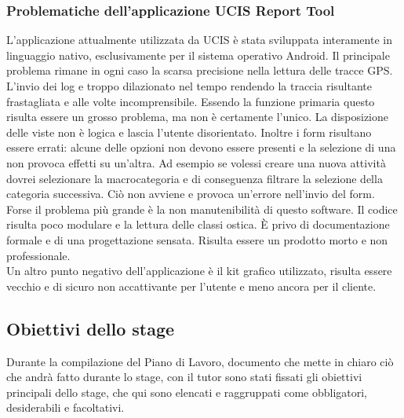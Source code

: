 \subsubsection{Problematiche dell'applicazione UCIS Report Tool}
L'applicazione attualmente utilizzata da UCIS è stata sviluppata interamente in linguaggio nativo, esclusivamente per il
sistema operativo \gls{Android}. Il principale problema rimane in ogni caso la scarsa precisione nella lettura delle
tracce GPS. L'invio dei log e troppo dilazionato nel tempo rendendo la traccia risultante frastagliata e alle volte
incomprensibile. Essendo la funzione primaria questo risulta essere un grosso problema, ma non è certamente l'unico. La
disposizione delle viste non è logica e lascia l'utente disorientato. Inoltre i form risultano essere errati: alcune
delle opzioni non devono essere presenti e la selezione di una non provoca effetti su un'altra. Ad esempio se volessi
creare una nuova attività dovrei selezionare la macrocategoria e di conseguenza filtrare la selezione della categoria
successiva. Ciò non avviene e provoca un'errore nell'invio del form. \\
\noindent Forse il problema più grande è la non manutenibilità di questo software. Il codice risulta poco modulare e la
lettura delle classi ostica. È privo di documentazione formale e di una progettazione sensata. Risulta essere un
prodotto morto e non professionale. \\
\noindent Un altro punto negativo dell'applicazione è il kit grafico utilizzato, risulta essere vecchio e di sicuro non
accattivante per l'utente e meno ancora per il cliente.

\subsection{Obiettivi dello stage}
\label{sec:obiettivi}

Durante la compilazione del Piano di Lavoro, documento che mette in chiaro ciò che andrà fatto durante lo stage, con il tutor sono stati fissati gli obiettivi principali dello stage, che qui sono elencati e raggruppati come obbligatori, desiderabili e facoltativi.

